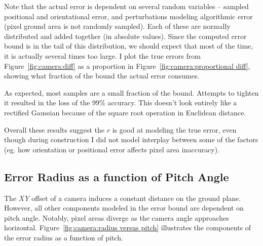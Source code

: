 \documentclass[a4paper,12pt,twoside,openright]{report}
\begin{document}



Note that the actual error is dependent on several random variables -- sampled positional and orientational
error, and perturbations modeling algorithmic error (pixel ground area is not randomly sampled). Each
of these are normally distributed and added together (in absolute values). Since the computed
error bound is in the tail of this distribution, we should expect that most of the time,
it is actually several times too large. I plot the true errors from Figure~\ref{fig:camera:diff}
as a proportion in Figure~\ref{fig:camera:proportional diff}, showing what fraction of the bound the actual error consumes.


As expected, most samples are a small fraction of the bound. Attempts to tighten it resulted in 
the loss of the 99\% accuracy. This doesn't look entirely like a rectified Gaussian because
of the square root operation in Euclidean distance.

Overall these results suggest the $r$ is good at modeling the true error, even though during construction
I did not model interplay between some of the factors (eg. how orientation 
or positional error affects pixel area inaccuracy).

\subsection{Error Radius as a function of Pitch Angle}

The \textit{XY} offset of a camera induces a constant distance on the ground plane. However,
all other components modeled in the error bound are dependent on pitch angle. Notably,
pixel areas diverge as the camera angle approaches horizontal. Figure~\ref{fig:camera:radius versus pitch}
illustrates the components of the error radius as a function of pitch.
\end{document}
